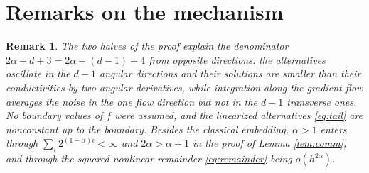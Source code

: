 \documentclass[12pt]{article}
\numberwithin{equation}{section}
\newtheorem{remark}[theorem]{Remark}
\begin{document}
\section{Remarks on the mechanism}\label{sec:remarks}

\begin{remark}
The two halves of the proof explain the denominator
$2\alpha+d+3=2\alpha+(d-1)+4$ from opposite directions: the alternatives oscillate in the $d-1$
angular directions and their solutions are smaller than their
conductivities by two angular derivatives, while integration along the
gradient flow averages the noise in the one flow direction but not in
the $d-1$ transverse ones. No boundary values of $f$ were assumed, and
the linearized alternatives \eqref{eq:tail} are nonconstant up to the
boundary. Besides the classical embedding, $\alpha>1$ enters through
$\sum_i2^{(1-\alpha)i}<\infty$ and $2\alpha>\alpha+1$ in the proof of
Lemma \ref{lem:comm}, and through the squared nonlinear remainder
\eqref{eq:remainder} being $o(h^{2\alpha})$.
\end{remark}
\end{document}
